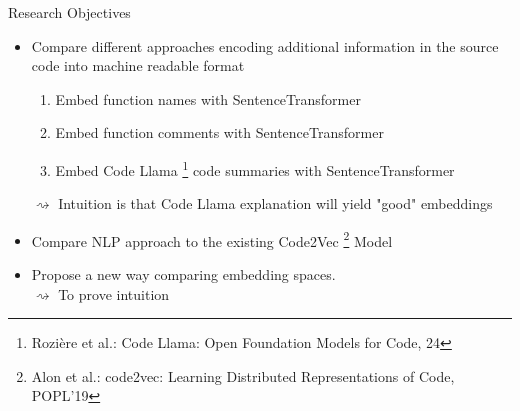 \documentclass[aspectratio=1610,12pt]{beamer}
\begin{document}
\begin{frame}[t]{Research Objectives}
  \begin{itemize}
    \item Compare different approaches encoding 
      additional information in the source code 
      into machine readable format
    \begin{enumerate}
      \item Embed function names with SentenceTransformer
      \item Embed function comments with SentenceTransformer
      \item Embed Code Llama 
        \footnote{\scriptsize Rozière et al.: 
            Code Llama: Open Foundation Models for Code,
            24
        }
        code summaries with SentenceTransformer
    \end{enumerate}
    $\rightsquigarrow$ Intuition is that Code Llama 
    explanation will yield "good" embeddings
    \item Compare NLP approach to the existing Code2Vec
        \footnote{\scriptsize Alon et al.: 
            code2vec: Learning Distributed Representations of Code,
            POPL'19
        }
      Model
    \item Propose a new way comparing embedding spaces.\\
    $\rightsquigarrow$ To prove intuition
  \end{itemize}
\end{frame}
\end{document}
